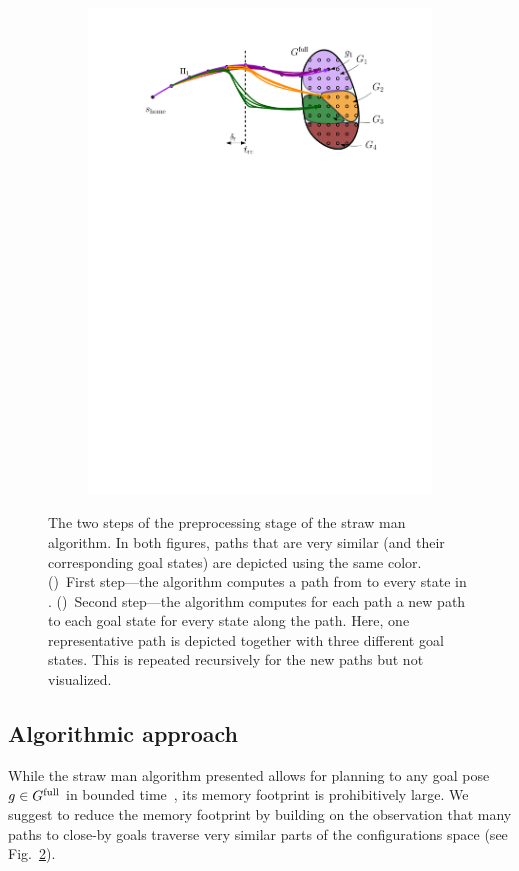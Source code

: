 \documentclass[conference]{IEEEtran}
\begin{document}
\begin{figure}[t]
\begin{subfigure}{0.225\textwidth}
        \includegraphics[width=\textwidth]{naive2}
        \caption{}
        \label{fig:naive2}
    \end{subfigure}
    \caption{The two steps of the preprocessing stage of the straw man algorithm. In both figures, paths that are very similar (and their corresponding goal states) are depicted using the same color.
    ()~First step---the algorithm computes a path from \Shome to every state in \Gfull.
    ()~Second step---the algorithm computes for each path a new path to each goal state for every state along the path. Here, one representative path is depicted together with three different goal states. 
    This is repeated recursively for the new paths but not visualized.}
    \label{fig:naive}
\end{figure}

\subsection{Algorithmic approach}
While the straw man algorithm presented  allows for planning to any goal pose $ g \in G^{\textrm{full}}$ in bounded time~\Tbound, its memory footprint is prohibitively large.
%
We suggest to reduce the memory footprint by building on the observation that many paths to close-by goals traverse very similar parts of the configurations space (see Fig.~\ref{fig:naive}).
\end{document}
